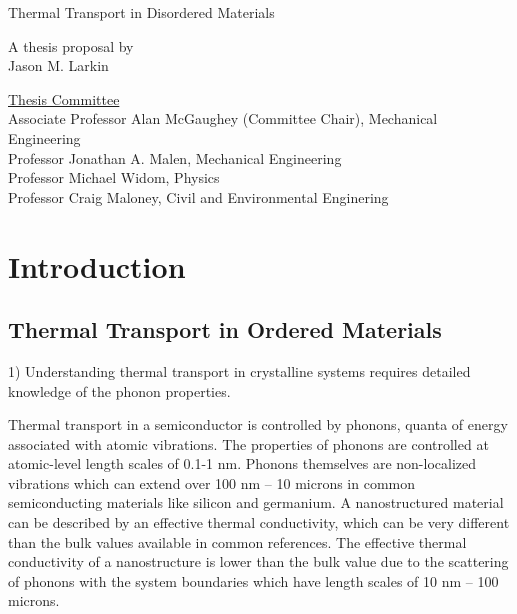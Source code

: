 \documentclass[letterpaper,12pt]{article}
\begin{document}
\begin{center}



\centering

\vspace{1.1in}

\LARGE Thermal Transport in Disordered Materials\Large

\vspace{1in} A thesis proposal by\\Jason M. Larkin\\
\vspace{1.1in}


\parbox[h]{4in}{}

\thispagestyle{empty}
\end{center}
\vspace{2.in}
\parbox[b]{6.5in}{\noindent \underline{Thesis Committee}\\
\noindent Associate Professor Alan McGaughey (Committee Chair), Mechanical Engineering\\
Professor Jonathan A. Malen, Mechanical Engineering \\
Professor Michael Widom, Physics \\
Professor Craig Maloney, Civil and Environmental Enginering\\}

\clearpage

\tableofcontents

\clearpage

\section{\label{S-Intro}Introduction}

\subsection{\label{S-Intro}Thermal Transport in Ordered Materials}

1) Understanding thermal transport in crystalline systems requires detailed knowledge of the phonon properties.

Thermal transport in a semiconductor is controlled by phonons, quanta of energy associated with atomic vibrations. The properties of phonons are controlled at atomic-level length scales of 0.1-1 nm. Phonons themselves are non-localized vibrations which can extend over 100 nm – 10 microns in common semiconducting materials like silicon and germanium.  A nanostructured material can be described by an effective thermal conductivity, which can be very different than the bulk values available in common references.  The effective thermal conductivity of a nanostructure is lower than the bulk value due to the scattering of phonons with the system boundaries which have length scales of 10 nm – 100 microns.
\end{document}
